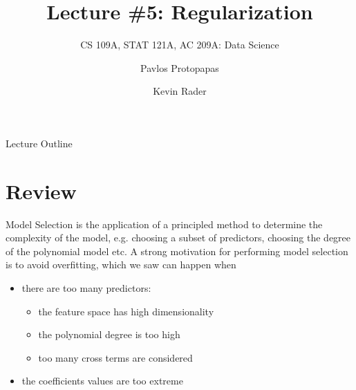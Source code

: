 \documentclass[12pt,t]{beamer}
\let\emph\relax %
\begin{document}

\title{\large{Lecture \#5: Regularization}}
\subtitle{CS 109A, STAT 121A, AC 209A: Data Science}
\author{Pavlos Protopapas \and Kevin Rader}
\date{}
{
\frame{
  \titlepage
  
}
}


\begin{frame}{Lecture Outline}
\tableofcontents
\end{frame}

\section{Review}

\begin{frame}{Model Selection} 
\emph{Model selection} is the application of a principled method to determine the complexity of the model, e.g. choosing a subset of predictors, choosing the degree of the polynomial model etc.
\vskip0.2cm
A strong motivation for performing model selection is to avoid overfitting, which we saw can happen when
\vskip0.4cm
\begin{itemize}
\item there are too many predictors:
\begin{itemize}
\item the feature space has high dimensionality
\item the polynomial degree is too high
\item too many cross terms are considered
\end{itemize}
\item the coefficients values are too extreme
\end{itemize}
\end{frame}
\end{document}
